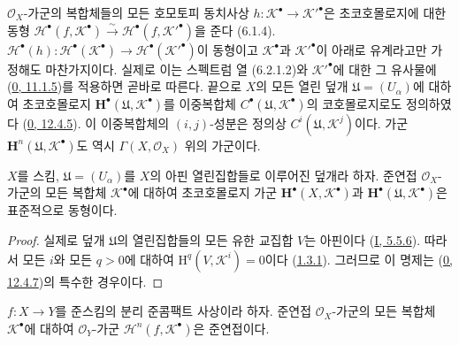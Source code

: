 \begin{env}[6.2.1]
$\mathscr O_X$-가군의 복합체들의 모든 호모토피 동치사상
$h:\mathscr K^\bullet\to\mathscr K'^\bullet$은 초코호몰로지에 대한 동형
$\mathscr H^\bullet(f,\mathscr K^\bullet)\xrightarrow{\sim}
\mathscr H^\bullet(f,\mathscr K'^\bullet)$을 준다 (6.1.4).
$\mathscr H^\bullet(h):\mathscr H^\bullet(\mathscr K^\bullet)\to
\mathscr H^\bullet(\mathscr K'^\bullet)$이 동형이고
$\mathscr K^\bullet$과 $\mathscr K'^\bullet$이 아래로 유계라고만
가정해도 마찬가지이다. 실제로 이는 스펙트럼 열 (6.2.1.2)와
$\mathscr K'^\bullet$에 대한 그 유사물에
(\hyperref[0.11.1.5-fr]{0, 11.1.5})를 적용하면 곧바로 따른다. 끝으로
$X$의 모든 열린 덮개 $\mathfrak U=(U_\alpha)$에 대하여 초코호몰로지
$\mathbf H^\bullet(\mathfrak U,\mathscr K^\bullet)$를 이중복합체
$C^\bullet(\mathfrak U,\mathscr K^\bullet)$의 코호몰로지로도 정의하였다
(\hyperref[0.12.4.5-fr]{0, 12.4.5}). 이 이중복합체의 $(i,j)$-성분은
정의상 $C^i(\mathfrak U,\mathscr K^j)$이다. 가군
$\mathbf H^n(\mathfrak U,\mathscr K^\bullet)$도 역시
$\Gamma(X,\mathscr O_X)$ 위의 가군이다.
\end{env}

\begin{proposition}[6.2.2]
\label{III.6.2.2-fr}
$X$를 스킴, $\mathfrak U=(U_\alpha)$를 $X$의 아핀 열린집합들로
이루어진 덮개라 하자. 준연접 $\mathscr O_X$-가군의 모든 복합체
$\mathscr K^\bullet$에 대하여 초코호몰로지 가군
$\mathbf H^\bullet(X,\mathscr K^\bullet)$과
$\mathbf H^\bullet(\mathfrak U,\mathscr K^\bullet)$은 표준적으로
동형이다.
\end{proposition}

\begin{proof}
실제로 덮개 $\mathfrak U$의 열린집합들의 모든 유한 교집합 $V$는
아핀이다 (\hyperref[I.5.5.6-ko]{I, 5.5.6}). 따라서 모든 $i$와 모든
$q>0$에 대하여 $\mathrm H^q(V,\mathscr K^i)=0$이다
(\hyperref[III.1.3.1-fr]{1.3.1}). 그러므로 이 명제는
(\hyperref[0.12.4.7-fr]{0, 12.4.7})의 특수한 경우이다.
\end{proof}


\begin{proposition}[6.2.3]
\label{III.6.2.3-fr}
$f:X\to Y$를 준스킴의 분리 준콤팩트 사상이라 하자. 준연접
$\mathscr O_X$-가군의 모든 복합체 $\mathscr K^\bullet$에 대하여
$\mathscr O_Y$-가군 $\mathscr H^n(f,\mathscr K^\bullet)$은
준연접이다.
\end{proposition}

